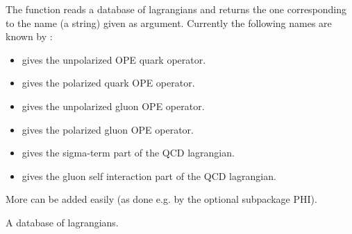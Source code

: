 The function  reads a database of lagrangians and returns the one corresponding to the name (a string) given as argument. Currently the following names are known by :
\begin{itemize}
 \item {} gives the unpolarized OPE quark operator.
 \item {} gives the polarized quark OPE operator.
 \item {} gives the unpolarized gluon OPE operator.
 \item {} gives the polarized gluon OPE operator.
 \item {} gives the sigma-term part of the QCD lagrangian.
 \item {} gives the gluon self interaction part of the QCD lagrangian.
\end{itemize}
More can be added easily (as done e.g. by the optional subpackage PHI).

 {A database of lagrangians.}

